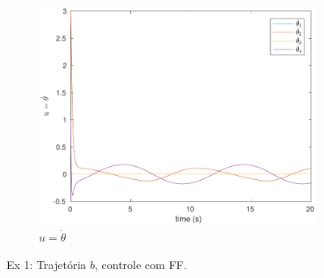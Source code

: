 \documentclass[a4paper,11pt]{article}
\theoremstyle{mytheor}
\begin{document}
\begin{figure}[!ht]
\begin{minipage}{\linewidth}
\begin{subfigure}[b]{0.45\textwidth}
    \end{subfigure}
    \begin{subfigure}[b]{0.45\textwidth}
    \includegraphics[width=1\textwidth]{figs/ex1_b_1_dq.pdf}
    \caption{$u = \dot{\theta}$}
    \label{fig:ex1_b_1_dq}
    \end{subfigure}
  \end{minipage}
\caption{Ex 1: Trajetória $b$, controle com FF.}
\label{fig:ex1_b_1}
\end{figure}
\end{document}
